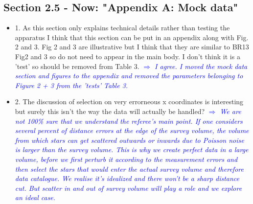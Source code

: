 \documentclass[10pt,a4paper]{article}
\newcommand{\Comment}[1]{\textsl{\textcolor{Blue}{$\Longrightarrow$ {#1}}}}
\begin{document}
\subsection{Section 2.5 - Now: "Appendix A: Mock data"}
\begin{itemize}
\item 1. As this section only explains technical details rather than testing the apparatus I think that this section can be put in an appendix along with Fig. 2 and 3. Fig 2 and 3 are illustrative but I think that they are similar to BR13 Fig2 and 3 so do not need to appear in the main body. I don't think it is a 'test' so should be removed from Table 3. \Comment{I agree. I moved the mock data section and figures to the appendix and removed the parameters belonging to Figure 2 + 3 from the 'tests' Table 3.}
\item 2. The discussion of selection on very errorneous x coordinates is interesting but surely this isn't the way the data will actually be handled?
\Comment{We are not 100\% sure that we understand the referee's main point. If one considers several percent of distance errors at the edge of the survey volume, the volume from which stars can get scattered outwards or inwards due to Poisson noise is larger than the survey volume. This is why we create perfect data in a large volume, before we first perturb it according to the measurement errors and then select the stars that would enter the actual survey volume and therefore data catalogue. We realise it's idealized and there won't be a sharp distance cut. But scatter in and out of survey volume will play a role and we explore an ideal case.}
\end{itemize}
\end{document}
